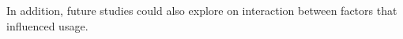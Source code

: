 \documentclass{sig-alternate}
\begin{document}
In addition, future studies could also explore on interaction between factors that influenced usage.  



%

%
%
\end{document}
